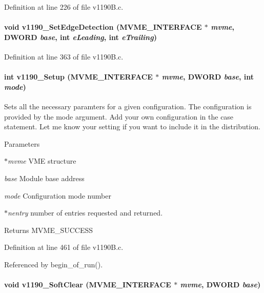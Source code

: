 Definition at line 226 of file v1190B.c.
\paragraph[{v1190\_\-SetEdgeDetection}]{\setlength{\rightskip}{0pt plus 5cm}void v1190\_\-SetEdgeDetection ({\bf MVME\_\-INTERFACE} $\ast$ {\em mvme}, \/  {\bf DWORD} {\em base}, \/  int {\em eLeading}, \/  int {\em eTrailing})}\hfill\label{v1190B_8c_a8f23d6c3a88ff52c4b6a87c9fcea2ad5}


Definition at line 363 of file v1190B.c.
\paragraph[{v1190\_\-Setup}]{\setlength{\rightskip}{0pt plus 5cm}int v1190\_\-Setup ({\bf MVME\_\-INTERFACE} $\ast$ {\em mvme}, \/  {\bf DWORD} {\em base}, \/  int {\em mode})}\hfill\label{v1190B_8c_a08c507c60af774a2828a1e0ff6eac4c2}
Sets all the necessary paramters for a given configuration. The configuration is provided by the mode argument. Add your own configuration in the case statement. Let me know your setting if you want to include it in the distribution. 
\begin{DoxyParams}{Parameters}
\item[{\em $\ast$mvme}]VME structure \item[{\em base}]Module base address \item[{\em mode}]Configuration mode number \item[{\em $\ast$nentry}]number of entries requested and returned. \end{DoxyParams}
\begin{DoxyReturn}{Returns}
MVME\_\-SUCCESS 
\end{DoxyReturn}


Definition at line 461 of file v1190B.c.

Referenced by begin\_\-of\_\-run().
\paragraph[{v1190\_\-SoftClear}]{\setlength{\rightskip}{0pt plus 5cm}void v1190\_\-SoftClear ({\bf MVME\_\-INTERFACE} $\ast$ {\em mvme}, \/  {\bf DWORD} {\em base})}\hfill\label{v1190B_8c_a3aab280a7becfaf91a6e5fd274c87a6f}


